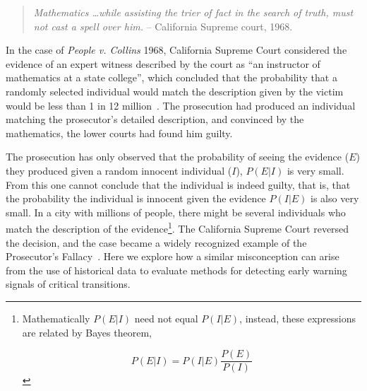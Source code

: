 \documentclass[authoryear,review,12pt]{elsarticle}
\begin{document}
\begin{quotation}
\noindent \emph{Mathematics \dots while assisting the trier of fact in the search of truth, must not cast a spell over him.}
-- California Supreme court, 1968.
\end{quotation}

\noindent In the case of \emph{People v. Collins} 1968, California Supreme
Court considered the evidence of an expert witness described by the
court as ``an instructor of mathematics at a state college'', which
concluded that the probability that a randomly selected individual
would match the description given by the victim would be less than 1 in
12 million~\citep{PeopleCollins1968}.  The prosecution had produced an
individual matching the prosecutor's detailed description, and convinced
by the mathematics, the lower courts had found him
guilty.


The prosecution has only observed that the probability of seeing the
evidence ($E$) they produced given a random innocent individual ($I$),
$P(E|I)$ is very small.  From this one cannot conclude that the individual
is indeed guilty, that is, that the probability the individual is innocent
given the evidence $P(I|E)$ is also very small. In a city with millions
of people, there might be several individuals who match the description
of the evidence\footnote{Mathematically $P(E|I)$ need not equal $P(I|E)$,
instead, these expressions are related by Bayes theorem,

\begin{equation}
  P(E|I) = P(I|E) \frac{P(E)}{P(I)}
\end{equation} 

}. The California Supreme Court reversed the decision, and
the case became a widely recognized example of the Prosecutor's
Fallacy~\citep{Thompson1987}.  Here we explore how a similar misconception
can arise from the use of historical data to evaluate methods for
detecting early warning signals of critical transitions.



\end{document}
